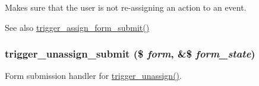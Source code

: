 Makes sure that the user is not re-\/assigning an action to an event.

\begin{DoxySeeAlso}{See also}
\hyperlink{trigger_8admin_8inc_adbb964aba3db9ae31067feff7af230ab}{trigger\_\-assign\_\-form\_\-submit()} 
\end{DoxySeeAlso}
\hypertarget{trigger_8admin_8inc_ae0e1a6cb2c032a6650a19c8d898896c0}{
\subsubsection[{trigger\_\-unassign\_\-submit}]{\setlength{\rightskip}{0pt plus 5cm}trigger\_\-unassign\_\-submit (\$ {\em form}, \/  \&\$ {\em form\_\-state})}}
\label{trigger_8admin_8inc_ae0e1a6cb2c032a6650a19c8d898896c0}
Form submission handler for \hyperlink{group__forms_ga0ffa8d4daef7b89cd984be08c612856b}{trigger\_\-unassign()}. 